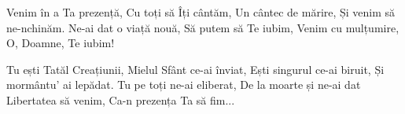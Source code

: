 \beginverse
Venim în a Ta prezență,
Cu toți să Îți cântăm,
Un cântec de mărire,
Și venim să ne-nchinăm.
Ne-ai dat o viață nouă,
Să putem să Te iubim,
Venim cu mulțumire,
O, Doamne, Te iubim!
\endverse

\beginchorus
Tu ești Tatăl Creațiunii,
Mielul Sfânt ce-ai înviat,
Ești singurul ce-ai biruit,
Și mormântu’ ai lepădat.
Tu pe toți ne-ai eliberat,
De la moarte și ne-ai dat
Libertatea să venim,
Ca-n prezența Ta să fim...
\endchorus
\endsong